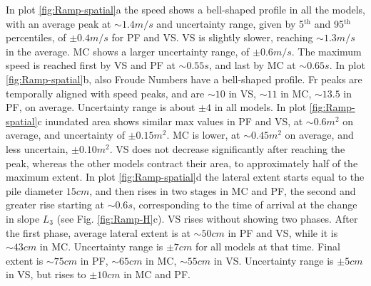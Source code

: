 \documentclass{article}
\begin{document}
In plot \ref{fig:Ramp-spatial}a the speed shows a bell-shaped profile in all the models, with an average peak at $\sim 1.4 m/s$ and uncertainty range, given by 5$^{\mathrm{th}}$ and 95$^{\mathrm{th}}$ percentiles, of $\pm 0.4 m/s$ for PF and VS. VS is slightly slower, reaching $\sim 1.3 m/s$ in the average. MC shows a larger uncertainty range, of $\pm 0.6 m/s$. The maximum speed is reached first by VS and PF at $\sim 0.55 s$, and last by MC at $\sim 0.65 s$. In plot \ref{fig:Ramp-spatial}b, also Froude Numbers have a bell-shaped profile. Fr peaks are temporally aligned with speed peaks, and are $\sim 10$ in VS, $\sim 11$ in MC, $\sim 13.5$ in PF, on average. Uncertainty range is about $\pm 4$ in all models. In plot \ref{fig:Ramp-spatial}c inundated area shows similar max values in PF and VS, at $\sim 0.6 m^2$ on average, and uncertainty of $\pm 0.15 m^2$. MC is lower, at $\sim 0.45 m^2$ on average, and less uncertain, $\pm 0.10 m^2$. VS does not decrease significantly after reaching the peak, whereas the other models contract their area, to approximately half of the maximum extent. In plot \ref{fig:Ramp-spatial}d the lateral extent starts equal to the pile diameter $15 cm$, and then rises in two stages in MC and PF, the second and greater rise starting at $\sim 0.6 s$, corresponding to the time of arrival at the change in slope $L_3$ (see Fig. \ref{fig:Ramp-H}c). VS rises without showing two phases. After the first phase, average lateral extent is at $\sim 50 cm$ in PF and VS, while it is $\sim 43 cm$ in MC. Uncertainty range is $\pm 7 cm$ for all models at that time. Final extent is $\sim 75 cm$ in PF, $\sim 65 cm$ in MC, $\sim 55 cm$ in VS. Uncertainty range is $\pm 5 cm$ in VS, but rises to $\pm 10 cm$ in MC and PF.
\end{document}
